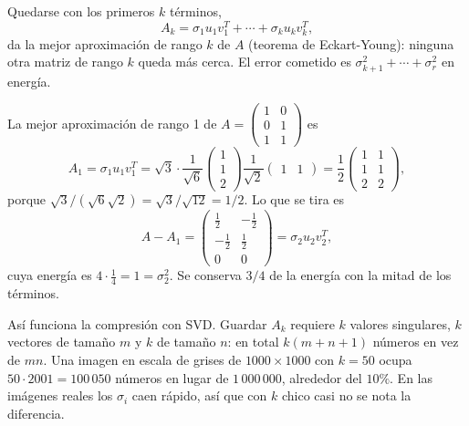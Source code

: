 \documentclass[11pt,letterpaper]{article}
\begin{document}
\begin{definicion}
    Quedarse con los primeros $k$ términos,
    \[
        A_k = \sigma_1 u_1 v_1^{T} + \cdots + \sigma_k u_k v_k^{T} ,
    \]
    da la mejor aproximación de rango $k$ de $A$ (teorema de
    Eckart-Young): ninguna otra matriz de rango $k$ queda más cerca.
    El error cometido es
    $\sigma_{k+1}^2 + \cdots + \sigma_r^2$ en energía.
\end{definicion}

\begin{ejemplo}
    La mejor aproximación de rango 1 de
    $A = \left(\begin{smallmatrix} 1 & 0 \\ 0 & 1 \\ 1 & 1
    \end{smallmatrix}\right)$ es
    \[
        A_1 = \sigma_1 u_1 v_1^{T}
            = \sqrt{3} \cdot \frac{1}{\sqrt{6}}
              \begin{pmatrix} 1 \\ 1 \\ 2 \end{pmatrix}
              \frac{1}{\sqrt{2}} \begin{pmatrix} 1 & 1 \end{pmatrix}
            = \frac{1}{2} \begin{pmatrix} 1 & 1 \\ 1 & 1 \\ 2 & 2
              \end{pmatrix} ,
    \]
    porque $\sqrt{3}/(\sqrt{6}\sqrt{2}) = \sqrt{3}/\sqrt{12} = 1/2$.
    Lo que se tira es
    \[
        A - A_1 = \begin{pmatrix} \tfrac{1}{2} & -\tfrac{1}{2} \\[2pt]
                  -\tfrac{1}{2} & \tfrac{1}{2} \\[2pt] 0 & 0
                  \end{pmatrix}
                = \sigma_2 u_2 v_2^{T} ,
    \]
    cuya energía es $4 \cdot \tfrac{1}{4} = 1 = \sigma_2^2$. Se
    conserva $3/4$ de la energía con la mitad de los términos.
\end{ejemplo}

\begin{idea}
    Así funciona la compresión con SVD. Guardar $A_k$ requiere $k$
    valores singulares, $k$ vectores de tamaño $m$ y $k$ de tamaño
    $n$: en total $k(m + n + 1)$ números en vez de $mn$. Una imagen en
    escala de grises de $1000 \times 1000$ con $k = 50$ ocupa
    $50 \cdot 2001 = 100\,050$ números en lugar de $1\,000\,000$,
    alrededor del $10\%$. En las imágenes reales los $\sigma_i$ caen
    rápido, así que con $k$ chico casi no se nota la diferencia.
\end{idea}
\end{document}
